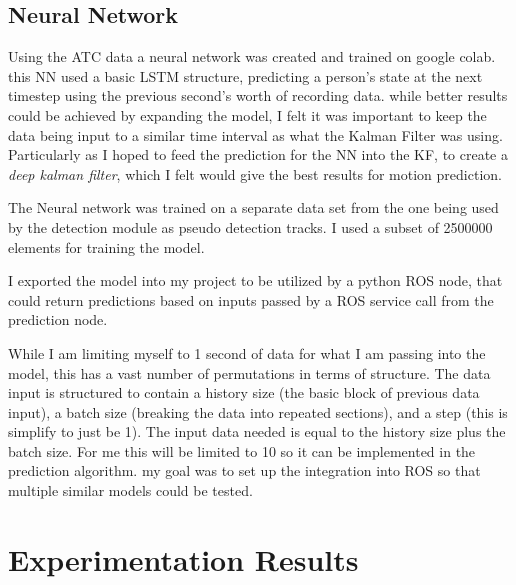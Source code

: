 \documentclass[10pt,a4paper]{article}
\begin{document}
\subsection{Neural Network}
Using the ATC data a neural network was created and trained on google colab. this NN used a basic LSTM structure, predicting a person's state at the next timestep using the previous second's worth of recording data. while better results could be achieved by expanding the model, I felt it was important to keep the data being input to a similar time interval as what the Kalman Filter was using. Particularly as I hoped to feed the prediction for the NN into the KF, to create a \textit{deep kalman filter}, which I felt would give the best results for motion prediction.

The Neural network was trained on a separate data set from the one being used by the detection module as pseudo detection tracks. I used a subset of 2500000 elements for training the model.

I exported the model into my project to be utilized by a python ROS node, that could return predictions based on inputs passed by a ROS service call from the prediction node.

While I am limiting myself to 1 second of data for what I am passing into the model, this has a vast number of permutations in terms of structure. The data input is structured to contain a history size (the basic block of previous data input), a batch size (breaking the data into repeated sections), and a step (this is simplify to just be 1). The input data needed is equal to the history size plus the batch size. For me this will be limited to 10 so it can be implemented in the prediction algorithm. my goal was to set up the integration into ROS so that multiple similar models could be tested.


\section{Experimentation Results}
\end{document}
